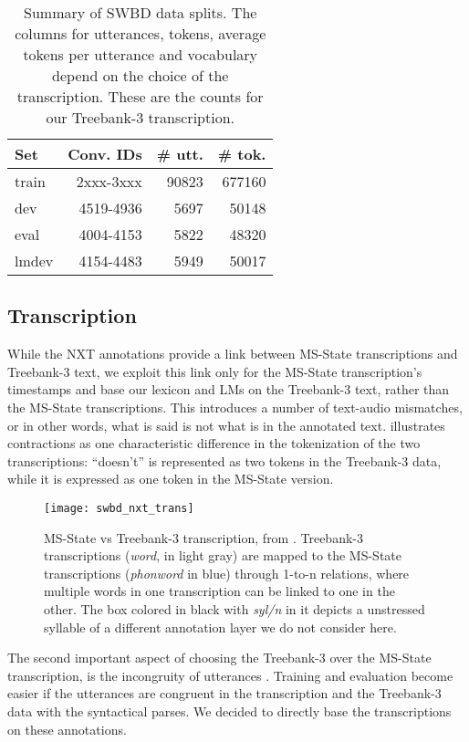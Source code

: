 \documentclass[11pt,letterpaper]{article}
\begin{document}
\begin{table}[h]
    \centering
    \begin{tabular}{@{}lrrr@{}}
        \toprule
        Set   & Conv. IDs & \# utt. & \# tok. \\ \midrule
        train & 2xxx-3xxx     & 90823      & 677160 \\
        dev   & 4519-4936     & 5697       & 50148 \\
        eval  & 4004-4153     & 5822       & 48320 \\ 
        lmdev & 4154-4483     & 5949       & 50017 \\ \bottomrule
    \end{tabular}
    \caption{Summary of SWBD data splits. The columns for utterances, tokens, average tokens per utterance and vocabulary depend on the choice of the transcription. These are the counts for our Treebank-3 transcription.}
    \label{tab:swbd}
\end{table}

\subsection{Transcription}\label{ssec:trans}
While the NXT annotations provide a link between MS-State transcriptions and Treebank-3 text, we exploit this link only for the MS-State transcription's timestamps and base our lexicon and LMs on the Treebank-3 text, rather than the MS-State transcriptions. This introduces a number of text-audio mismatches, or in other words, what is said is not what is in the annotated text.  illustrates contractions as one characteristic difference in the tokenization of the two transcriptions: ``doesn't'' is represented as two tokens in the Treebank-3 data, while it is expressed as one token in the MS-State version.
\begin{figure}[h!]
    \centering
    \texttt{[image: swbd\_nxt\_trans]}
    \caption[MS-State vs Treebank-3 transcription.]{MS-State vs Treebank-3 transcription, from \citet[p.~392]{CalhounEtal:2010}. Treebank-3 transcriptions (\textit{word}, in light gray) are mapped to the MS-State transcriptions (\textit{phonword} in blue) through 1-to-n relations, where multiple words in one transcription can be linked to one in the other. The box colored in black with \emph{syl/n} in it depicts a unstressed syllable of a different annotation layer we do not consider here.}
    \label{fig:nxt}
\end{figure}
The second important aspect of choosing the Treebank-3 over the MS-State transcription, is the incongruity of utterances \citep[cf.][ch.~3.3,~p.~393ff]{CalhounEtal:2010}. Training and evaluation become easier if the utterances are congruent in the transcription and the Treebank-3 data with the syntactical parses. We decided to directly base the transcriptions on these annotations.
\end{document}
